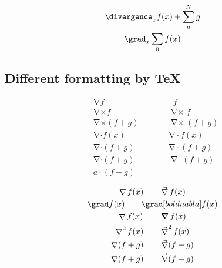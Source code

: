 \documentclass[parskip=half]{scrartcl}
\begin{document}
\fulllinerule

\begin{Example}[label={Interactions with Other Stuff},gobble=2]
  \begin{gather*}
    \divergence_{x} f(x) + \sum_{a}^{N} g\\
    \grad_{x}\sum_{0} f(x)
  \end{gather*}
\end{Example}

\subsection{Different formatting by \TeX{}}

\begin{Example}[gobble=2]
  \begin{align*}
    &\mathop{\nabla} f &\qquad &\mathop{\vec{\nabla}} f\\
    &{\mathop{\nabla}}\times f &\qquad &\mathop{\mathop{\nabla}\times}\nolimits f\\
    &{\mathop{\nabla}\nolimits}\times (f+g)
    &\qquad &\mathop{\mathop{\nabla}\nolimits\times}\nolimits (f+g)\\
    &\mathop{\nabla}\nolimits\cdot f(x)
    &\qquad &\mathop{\nabla}\nolimits\mathrel{\cdot} f(x)\\
    &\mathop{\nabla}\nolimits\cdot (f+g)
    &\qquad &\mathop{\nabla}\nolimits\mathrel{\cdot} (f+g)\\
    &\mathop{\nabla}\nolimits\cdot (f+g)
    &\qquad &\mathop{\mathop{\nabla}\mathrel{\cdot}}\nolimits (f+g)\\
    &a \cdot (f+g)
  \end{align*}
\end{Example}

\begin{Example}[gobble=2,label={Different Gradient Operators}]
  \begin{gather*}
    \mathop{\nabla}\nolimits f(x)
    \qquad\mathop{\vec{\vcenter{\hbox{$\nabla$}}}}\nolimits f(x)\\
    \grad f(x) \qquad \grad[boldnabla] f(x)\\
    \mathop{\nabla}\nolimits f(x) \qquad
    \mathop{\boldsymbol\nabla}\nolimits f(x)\\
    \mathop{\nabla}\nolimits^{2} f(x)
    \qquad\mathop{\vec{\vcenter{\hbox{$\nabla$}}}}\nolimits^{2} f(x)\\
    \mathop{\nabla}\nolimits (f+g)
    \qquad\mathop{\vec{\vcenter{\hbox{$\nabla$}}}}\nolimits (f+g)\\
    \mathop{\nabla}\nolimits (f+g)
    \qquad \mathop{\vec{\nabla}}\nolimits (f+g)
  \end{gather*}
\end{Example}
\end{document}
